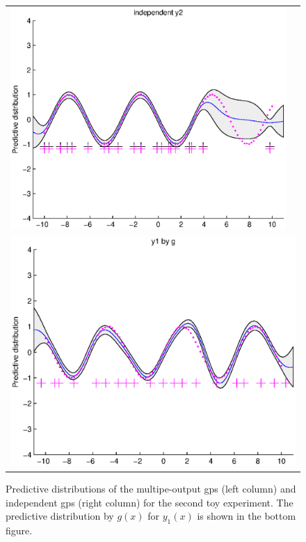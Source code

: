 \begin{figure}
\begin{tabular}{cc}
\includegraphics[scale=0.5]{figures/ssvi2-svi2.eps} \\
\multicolumn{2}{c}{\includegraphics[scale=0.5]{figures/ssvi-y1byg.eps} }
\end{tabular}
\label{fig5}
\caption{Predictive distributions of the multipe-output gps (left column) and independent gps (right column) for the second toy experiment. The predictive distribution by $g(x)$ for $y_1(x)$ is shown in the bottom figure.}
\end{figure}

